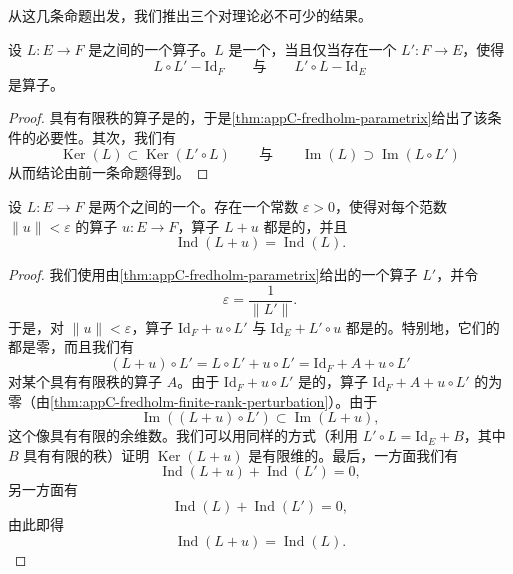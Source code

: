 从这几条命题出发，我们推出三个对\trFredholmOperator{}理论必不可少的结果。

\begin{theorem}\label{thm:appC-fredholm-compact-regularization}
设 $L : E \to F$ 是\trBanachSpace{}之间的一个算子。$L$ 是一个\trFredholmOperator，当且仅当存在一个 $L' : F \to E$，使得
\[
L \circ L' - \mathrm{Id}_F \qquad\text{与}\qquad L' \circ L - \mathrm{Id}_E
\]
是\trCompact{}算子。
\end{theorem}

\begin{proof}
具有有限秩的算子是\trCompact{}的，于是\cref{thm:appC-fredholm-parametrix}给出了该条件的必要性。其次，我们有
\[
\operatorname{Ker}(L) \subset \operatorname{Ker}(L' \circ L) \qquad\text{与}\qquad \operatorname{Im}(L) \supset \operatorname{Im}(L \circ L')
\]
从而结论由前一条命题得到。
\end{proof}

\begin{theorem}\label{thm:appC-index-stability}
设 $L : E \to F$ 是两个\trBanachSpace{}之间的一个\trFredholmOperator。存在一个常数 $\varepsilon > 0$，使得对每个范数 $\|u\| < \varepsilon$ 的算子 $u : E \to F$，算子 $L + u$ 都是\trFredholm{}的，并且
\[
\operatorname{Ind}(L + u) = \operatorname{Ind}(L).
\]
\end{theorem}

\begin{proof}
我们使用由\cref{thm:appC-fredholm-parametrix}给出的一个算子 $L'$，并令
\[
\varepsilon = \frac{1}{\|L'\|}.
\]
于是，对 $\|u\| < \varepsilon$，算子 $\mathrm{Id}_F + u \circ L'$ 与 $\mathrm{Id}_E + L' \circ u$ 都是\trInvertible{}的。特别地，它们的\trIndex{}都是零，而且我们有
\[
(L + u) \circ L' = L \circ L' + u \circ L' = \mathrm{Id}_F + A + u \circ L'
\]
对某个具有有限秩的算子 $A$。由于 $\mathrm{Id}_F + u \circ L'$ 是\trInvertible{}的，算子 $\mathrm{Id}_F + A + u \circ L'$ 的\trIndex{}为零（由\cref{thm:appC-fredholm-finite-rank-perturbation}）。由于
\[
\operatorname{Im}((L + u) \circ L') \subset \operatorname{Im}(L + u),
\]
这个像具有有限的余维数。我们可以用同样的方式（利用 $L' \circ L = \mathrm{Id}_E + B$，其中 $B$ 具有有限的秩）证明 $\operatorname{Ker}(L + u)$ 是有限维的。最后，一方面我们有
\[
\operatorname{Ind}(L + u) + \operatorname{Ind}(L') = 0,
\]
另一方面有
\[
\operatorname{Ind}(L) + \operatorname{Ind}(L') = 0,
\]
由此即得
\[
\operatorname{Ind}(L + u) = \operatorname{Ind}(L).
\]
\end{proof}

